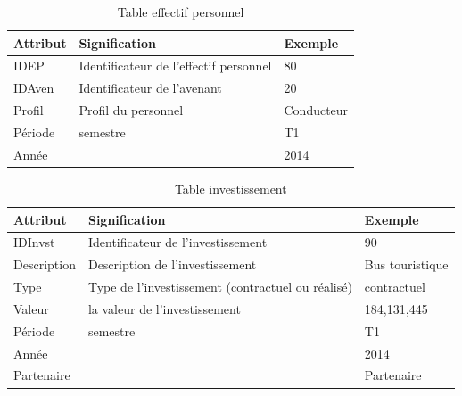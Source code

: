 \documentclass[a4paper]{report}
\begin{document}
\begin{doublespace}
	\begin{table}[H]
		\begin{center}
			\begin{tabularx}{17.5cm}{|X|X|X|}
				\hline
				\textbf{Attribut} & \textbf{Signification}                 &
				\textbf{Exemple}                                                        \\
				\hline
				IDEP              & Identificateur de l'effectif personnel & 80         \\
				\hline
				IDAven            & Identificateur de l'avenant            & 20         \\
				\hline
				Profil            & Profil du personnel                    & Conducteur \\
				\hline
				Période           & semestre                               & T1         \\
				\hline
				Année             &                                        & 2014       \\
				\hline
			\end{tabularx}
			\caption{Table effectif personnel}
		\end{center}
	\end{table}

	\begin{table}[H]
		\begin{center}
			\begin{tabularx}{17.5cm}{|p{4cm}|X|p{4cm}|}
				\hline
				\textbf{Attribut} & \textbf{Signification}                            &
				\textbf{Exemple}                                                                    \\
				\hline
				IDInvst           & Identificateur de l'investissement                & 90          \\
				\hline
				Description       & Description de l'investissement                    & Bus
				touristique                                                                         \\
				\hline
				Type              & Type de l'investissement (contractuel ou réalisé) &
				contractuel                                                                         \\
				\hline
				Valeur            & la valeur de l'investissement                     & 184,131,445 \\
				\hline
				Période           & semestre                                          & T1          \\
				\hline
				Année             &                                                   & 2014        \\
				\hline
				Partenaire        &                                                   & Partenaire  \\
				\hline
			\end{tabularx}
			\caption{Table investissement}
		\end{center}
	\end{table}


\end{doublespace}
\end{document}
